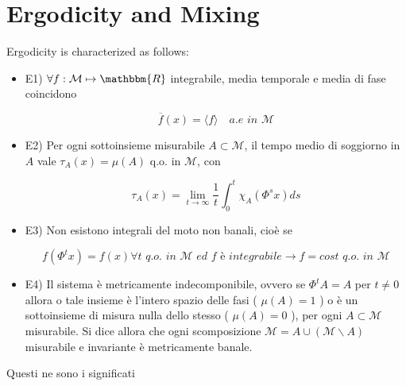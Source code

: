 \documentclass{article}
\begin{document}

\newpage
\section{Ergodicity and Mixing}

Ergodicity is characterized as follows:

\begin{itemize}

\item 

E1) $\forall f:\mathcal{M} \mapsto \mathbbm{R}$ integrabile, media temporale e media di fase coincidono
	
$$\overline{f}(x) = \langle f \rangle \quad \textit{a.e 		in } \mathcal{M}$$

\item
E2) Per ogni sottoinsieme misurabile $A \subset \mathcal{M}$, il tempo medio di soggiorno in $A$ vale $\tau_A(x) = \mu(A)$ q.o. in $\mathcal{M}$, con
	
$$ \tau_A(x) = \lim\limits_{t \to \infty} \frac{1}{t} \int_{0}^{t} \chi_A(\Phi^s x) ds$$

\item
E3) Non esistono integrali del moto non banali, cioè se

$$ f(\Phi^tx)=f(x) \forall t \textit{ q.o. in } \mathcal{M} \textit{ ed f è integrabile} \rightarrow f = cost \textit{ q.o. in } \mathcal{M} $$

\item

E4) Il sistema è metricamente indecomponibile, ovvero se $\Phi^t A = A $ per $t \neq 0 $ allora o tale insieme è l'intero spazio delle fasi ( $\mu(A)=1$ ) o è un sottoinsieme di misura nulla dello stesso ( $\mu(A)=0$ ), per ogni $A \subset \mathcal{M}$ misurabile. Si dice allora che ogni scomposizione $\mathcal{M} = A \cup (\mathcal{M} \backslash A)$ misurabile e invariante è metricamente banale.

\end{itemize}

Questi ne sono i significati
\end{document}
